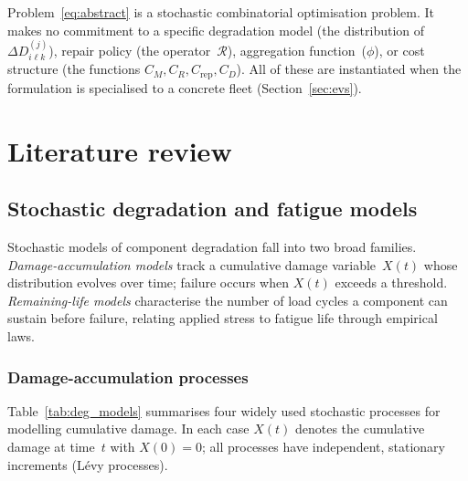 \documentclass[11pt,a4paper]{article}
\theoremstyle{plain}
\theoremstyle{definition}
\theoremstyle{remark}
\begin{document}
Problem~\eqref{eq:abstract} is a stochastic combinatorial optimisation problem.
It makes no commitment to a specific degradation model (the distribution of~$\Delta D_{i\ell k}^{(j)}$), repair policy (the operator~$\mathcal{R}$), aggregation function~($\phi$), or cost structure (the functions $C_M, C_R, C_{\mathrm{rep}}, C_D$).
All of these are instantiated when the formulation is specialised to a concrete fleet (Section~\ref{sec:evs}).

\section{Literature review}

\subsection{Stochastic degradation and fatigue models}

Stochastic models of component degradation fall into two broad families.
\emph{Damage-accumulation models} track a cumulative damage variable~$X(t)$ whose distribution evolves over time; failure occurs when $X(t)$ exceeds a threshold.
\emph{Remaining-life models} characterise the number of load cycles a component can sustain before failure, relating applied stress to fatigue life through empirical laws.

\subsubsection{Damage-accumulation processes}

Table~\ref{tab:deg_models} summarises four widely used stochastic processes for modelling cumulative damage.
In each case $X(t)$ denotes the cumulative damage at time~$t$ with $X(0)=0$; all processes have independent, stationary increments (L\'evy processes).
\end{document}
